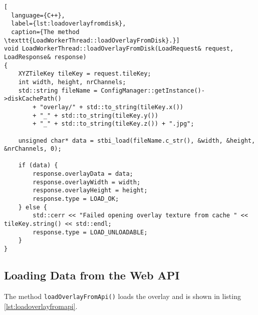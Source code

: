\begin{lstlisting}[
  language={C++},
  label={lst:loadoverlayfromdisk},
  caption={The method \texttt{LoadWorkerThread::loadOverlayFromDisk}.}]
void LoadWorkerThread::loadOverlayFromDisk(LoadRequest& request, LoadResponse& response)
{
    XYZTileKey tileKey = request.tileKey;
    int width, height, nrChannels;
    std::string fileName = ConfigManager::getInstance()->diskCachePath()
        + "overlay/" + std::to_string(tileKey.x()) 
        + "_" + std::to_string(tileKey.y()) 
        + "_" + std::to_string(tileKey.z()) + ".jpg";

    unsigned char* data = stbi_load(fileName.c_str(), &width, &height, &nrChannels, 0);

    if (data) {
        response.overlayData = data;
        response.overlayWidth = width;
        response.overlayHeight = height;
        response.type = LOAD_OK;
    } else {
        std::cerr << "Failed opening overlay texture from cache " << tileKey.string() << std::endl;
        response.type = LOAD_UNLOADABLE;
    }
}
\end{lstlisting}

\subsection{Loading Data from the Web API}
The method \texttt{loadOverlayFromApi()}
loads the overlay and is shown in listing \ref{lst:loadoverlayfromapi}.

